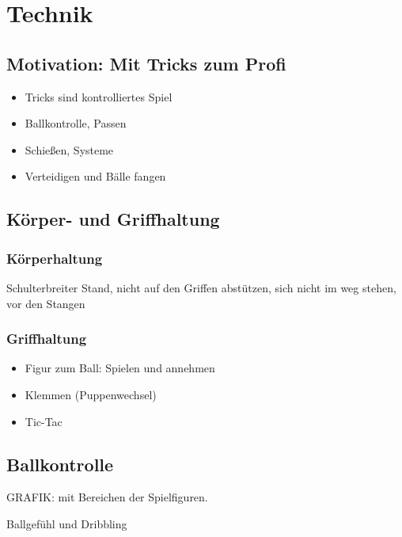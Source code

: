 \chapter{Technik}
\label{technik}

\section{Motivation: Mit Tricks zum Profi}
\label{technik:motivation}

\begin{itemize}
\item Tricks sind kontrolliertes Spiel
\item Ballkontrolle, Passen
\item Schießen, Systeme
\item Verteidigen und Bälle fangen
\end{itemize}

\section{Körper- und Griffhaltung}
\label{technik:haltung}

\subsection{Körperhaltung}
\label{technik:haltung:koerper}
Schulterbreiter Stand, nicht auf den Griffen abstützen, sich nicht im weg stehen, vor den Stangen

\subsection{Griffhaltung}
\label{technik:haltung:griffe}



\begin{itemize}
\item Figur zum Ball: Spielen und annehmen
\item Klemmen (Puppenwechsel)
\item Tic-Tac
\end{itemize}


\section{Ballkontrolle}
\label{technik:ballkontrolle}

GRAFIK: mit Bereichen der Spielfiguren.

Ballgefühl und Dribbling

